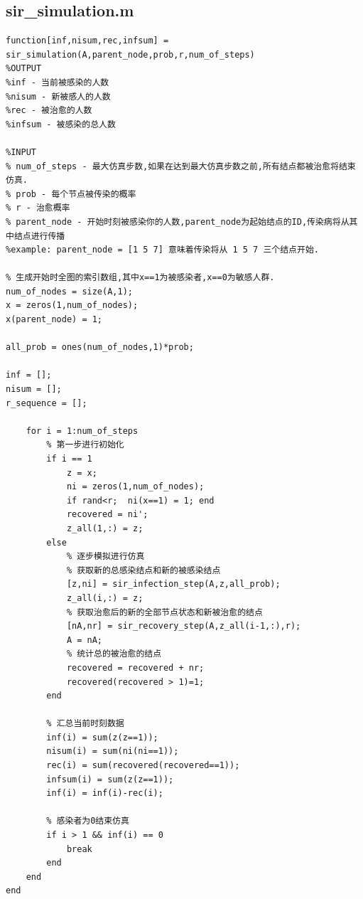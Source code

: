 \documentclass[supercite]{HustGraduPaper}
\begin{document}
	\subsection{sir\_simulation.m}
	\begin{lstlisting}
function[inf,nisum,rec,infsum] = sir_simulation(A,parent_node,prob,r,num_of_steps)
%OUTPUT
%inf - 当前被感染的人数
%nisum - 新被感人的人数
%rec - 被治愈的人数
%infsum - 被感染的总人数

%INPUT
% num_of_steps - 最大仿真步数,如果在达到最大仿真步数之前,所有结点都被治愈将结束仿真.
% prob - 每个节点被传染的概率
% r - 治愈概率
% parent_node - 开始时刻被感染你的人数,parent_node为起始结点的ID,传染病将从其中结点进行传播
%example: parent_node = [1 5 7] 意味着传染将从 1 5 7 三个结点开始.

% 生成开始时全图的索引数组,其中x==1为被感染者,x==0为敏感人群.
num_of_nodes = size(A,1);
x = zeros(1,num_of_nodes);
x(parent_node) = 1;

all_prob = ones(num_of_nodes,1)*prob;

inf = [];
nisum = [];
r_sequence = [];

    for i = 1:num_of_steps 
        % 第一步进行初始化
        if i == 1
            z = x;
            ni = zeros(1,num_of_nodes);
            if rand<r;  ni(x==1) = 1; end
            recovered = ni';
            z_all(1,:) = z;
        else
            % 逐步模拟进行仿真
            % 获取新的总感染结点和新的被感染结点
            [z,ni] = sir_infection_step(A,z,all_prob);
            z_all(i,:) = z;
            % 获取治愈后的新的全部节点状态和新被治愈的结点
            [nA,nr] = sir_recovery_step(A,z_all(i-1,:),r);
            A = nA;
            % 统计总的被治愈的结点
            recovered = recovered + nr;
            recovered(recovered > 1)=1;
        end
        
        % 汇总当前时刻数据
        inf(i) = sum(z(z==1));
        nisum(i) = sum(ni(ni==1));
        rec(i) = sum(recovered(recovered==1));
        infsum(i) = sum(z(z==1));
        inf(i) = inf(i)-rec(i);
        
        % 感染者为0结束仿真
        if i > 1 && inf(i) == 0
            break
        end
    end
end
	\end{lstlisting}
\end{document}
